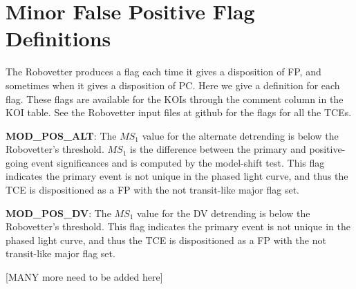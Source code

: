 \section{Minor False Positive Flag Definitions}
\label{s:minorflags}
The Robovetter produces a flag each time it gives a disposition of FP, and sometimes when it gives a disposition of PC.  Here we give a definition for each flag.  These flags are available for the KOIs through the comment column in the KOI table. See the Robovetter input files at github for the flags for all the TCEs.


\textbf{MOD\_POS\_ALT}: The $MS_1$ value for the alternate detrending is below the Robovetter's threshold. $MS_1$ is the difference between the primary and positive-going event significances and is computed by the model-shift test. This flag indicates the primary event is not unique in the phased light curve, and thus the TCE is dispositioned as a FP with the not transit-like major flag set. 

\textbf{MOD\_POS\_DV}: The $MS_1$ value for the DV detrending is below the Robovetter's threshold. This flag indicates the primary event is not unique in the phased light curve, and thus the TCE is dispositioned as a FP with the not transit-like major flag set. 

[MANY more need to be added here]